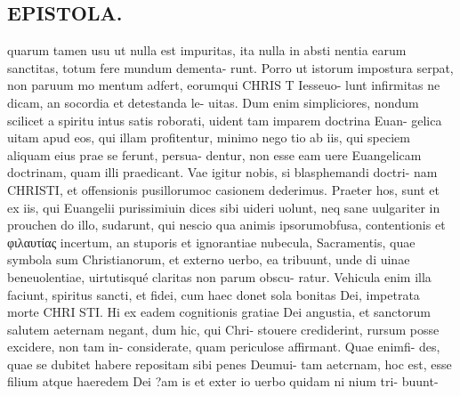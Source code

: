 \documentclass{article}
\begin{document}
\begin{pages}
\section*{EPISTOLA. }\pstart quarum tamen usu ut nulla est impuritas, ita nulla in absti nentia earum sanctitas, totum fere mundum dementa- runt. Porro ut istorum impostura serpat, non paruum mo mentum adfert, eorumqui CHRIS T Iesseuo- lunt infirmitas ne dicam, an socordia et detestanda le- uitas. Dum enim simpliciores, nondum scilicet a spiritu intus satis roborati, uident tam imparem doctrina Euan- gelica uitam apud eos, qui illam profitentur, minimo nego tio ab iis, qui speciem aliquam eius prae se ferunt, persua- dentur, non esse eam uere Euangelicam doctrinam, quam illi praedicant.  Vae igitur nobis, si blasphemandi doctri- nam CHRISTI, et offensionis pusillorumoc casionem dederimus.  \pend\pstart Praeter hos, sunt et ex iis, qui Euangelii purissimiuin dices sibi uideri uolunt, neq sane uulgariter in prouchen do illo, sudarunt, qui nescio qua animis ipsorumobfusa, contentionis et φιλαυτίας incertum, an stuporis et ignorantiae nubecula, Sacramentis, quae symbola sum Christianorum, et externo uerbo, ea tribuunt, unde di uinae beneuolentiae, uirtutisqué claritas non parum obscu- ratur. Vehicula enim illa faciunt, spiritus sancti, et fidei, cum haec donet sola bonitas Dei, impetrata morte CHRI STI. Hi ex eadem cognitionis gratiae Dei angustia, et sanctorum salutem aeternam negant, dum hic, qui Chri- stouere crediderint, rursum posse excidere, non tam in- considerate, quam periculose affirmant. Quae enimfi- des, quae se dubitet habere repositam sibi penes Deumui- tam aetcrnam, hoc est, esse filium atque haeredem Dei ?am  \pendSacramen is et exter io uerbo quidam ni nium tri- buunt- 

\end{pages}
\end{document}
